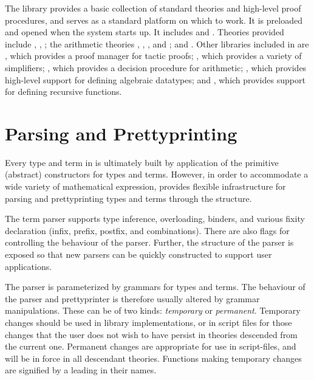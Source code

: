 The  library provides a basic collection of standard
theories and high-level proof procedures, and serves as a standard
platform on which to work. It is preloaded and opened when the \HOL{}
system starts up. It includes  and
. Theories provided include ,
, ; the arithmetic theories
, , ,
and ; and . Other libraries
included in  are , which provides
a proof manager for tactic proofs; , which provides
a variety of simplifiers; , which provides a decision
procedure for arithmetic; , which provides
high-level support for defining algebraic datatypes; and ,
which provides support for defining recursive functions.


\section{Parsing and Prettyprinting}
\label{sec:parsing-printing}

Every type and term in \HOL{} is ultimately built by application of
the primitive (abstract) constructors for types and terms. However, in
order to accommodate a wide variety of mathematical expression, \HOL{}
provides flexible infrastructure for parsing and prettyprinting types
and terms through the  structure.

The term parser supports type inference, overloading, binders, and
various fixity declaration (infix, prefix, postfix, and
combinations). There are also flags for controlling the behaviour
of the parser. Further, the structure of the parser is exposed so that
new parsers can be quickly constructed to support user applications.

The parser is parameterized by grammars for types and terms. The
behaviour of the parser and prettyprinter is therefore usually altered
by grammar manipulations.
%
%
These can be of two kinds: \emph{temporary} or \emph{permanent}.
Temporary changes should be used in library implementations, or in
script files for those changes that the user does not wish to have
persist in theories descended from the current one.  Permanent changes
are appropriate for use in script-files, and will be in force in all
descendant theories.  Functions making temporary changes are signified
by a leading  in their names.

